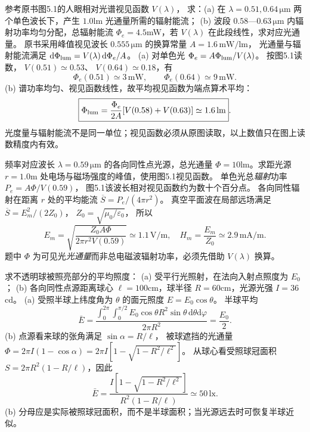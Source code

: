 参考原书图5.1的人眼相对光谱视见函数 $V(\lambda)$，
求：(a) 在 $\lambda=0.51,0.64\,\mathrm{\mu m}$ 两个单色波长下，产生 $1.0$lm 光通量所需的辐射能流；
(b) 波段 $0.58$—$0.63\,\mathrm{\mu m}$ 内辐射功率均匀分配，总辐射能流 $\Phi_e=4.5$mW，若 $V(\lambda)$ 在此段线性，求对应光通量。
\exsolution
原书采用峰值视见波长 $0.555\,\mathrm{\mu m}$ 的换算常量
$A=1.6\,\mathrm{mW/lm}$，
光通量与辐射能流满足
$\mathrm d\Phi_{\rm lum}=V(\lambda)\,\mathrm d\Phi_e/A$。
(a) 对单色光
$\Phi_e=A\Phi_{\rm lum}/V(\lambda)$。
按图5.1读数，
$V(0.51)\simeq0.53$、
$V(0.64)\simeq0.18$，有
\[
\boxed{\Phi_e(0.51)\simeq3\,\mathrm{mW}},\qquad
\boxed{\Phi_e(0.64)\simeq9\,\mathrm{mW}}.
\]
(b) 谱功率均匀、视见函数线性，故平均视见函数为端点算术平均：
\[
\boxed{\Phi_{\rm lum}
=\frac{\Phi_e}{2A}
[V(0.58)+V(0.63)]
\simeq1.6\,\mathrm{lm}}.
\]
\excheck 光度量与辐射能流不是同一单位；视见函数必须从原图读取，以上数值只在图上读数精度内有效。

频率对应波长 $\lambda=0.59\,\mathrm{\mu m}$ 的各向同性点光源，总光通量 $\Phi=10$lm。求距光源 $r=1.0$m 处电场与磁场强度的峰值，使用图5.1视见函数。
\exsolution
单色光总\emph{辐射}功率
$P_e=A\Phi/V(0.59)$，
图5.1该波长相对视见函数约为数十个百分点。
各向同性辐射在距离 $r$ 处的平均能流
$\overline S=P_e/(4\pi r^2)$。
真空平面波在局部远场满足
$\overline S=E_m^2/(2Z_0)$，
$Z_0=\sqrt{\mu_0/\varepsilon_0}$，
所以
\[
\boxed{E_m=
\sqrt{\frac{Z_0 A\Phi}{2\pi r^2V(0.59)}}
\simeq1.1\,\mathrm{V/m}},
\quad
\boxed{H_m=\frac{E_m}{Z_0}
\simeq2.9\,\mathrm{mA/m}}.
\]
\excheck 题中 $\Phi$ 为可见光\emph{光通量}而非总电磁波辐射功率，必须先借助 $V(\lambda)$ 换算。

求不透明球被照亮部分的平均照度：
(a) 受平行光照射，在法向入射点照度为 $E_0$；
(b) 各向同性点源距离球心 $\ell=100$cm，球半径 $R=60$cm，光源光强 $I=36$cd。
\exsolution
(a) 受照半球上纬度角为 $\theta$ 的面元照度 $E=E_0\cos\theta$。
半球平均
\[
\boxed{\bar E=\frac{\int_0^{2\pi}\!\!\int_0^{\pi/2}
E_0\cos\theta R^2\sin\theta\,\mathrm d\theta\mathrm d\varphi}
{2\pi R^2}=\frac{E_0}{2}}.
\]
(b) 点源看来球的张角满足
$\sin\alpha=R/\ell$，
被球遮挡的光通量
$\Phi=2\pi I(1-\cos\alpha)
=2\pi I[1-\sqrt{1-R^2/\ell^2}]$。
从球心看受照球冠面积
$S=2\pi R^2(1-R/\ell)$，因此
\[
\boxed{\bar E=
\frac{I[1-\sqrt{1-R^2/\ell^2}]}
{R^2(1-R/\ell)}
\simeq50\,\mathrm{lx}}.
\]
\excheck (b) 分母应是实际被照球冠面积，而不是半球面积；当光源远去时可恢复半球近似。

